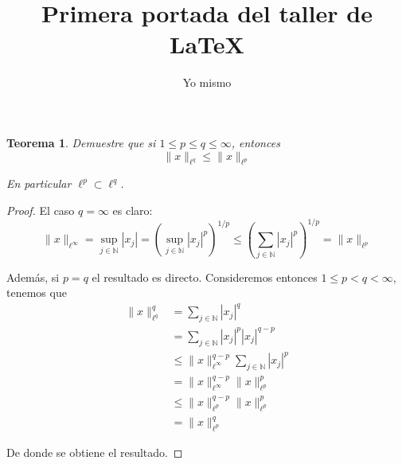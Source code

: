 \documentclass{article}
\title{Primera portada del taller de \LaTeX}
\author{Yo mismo}
\newtheorem{teo}{Teorema}
\begin{document}

\begin{titlepage}
\thispagestyle{empty}
\maketitle
\end{titlepage}

\begin{teo} Demuestre que si $1 \leq p \leq q \leq \infty$, entonces
	$$\|x\|_{\ell^{q}} \leq \|x\|_{\ell^{p}}$$
	
En particular $\ell^{p} \subset \ell^{q}$.
\end{teo}

\begin{proof} El caso $q = \infty$ es claro:
	$$\|x\|_{\ell^{\infty}} 
		= 	\sup_{j \in \mathbb{N}} |x_{j}|
		= 	\left(\sup_{j \in \mathbb{N}} |x_{j}|^{p}\right)^{1/p} 
		\leq	\left(\sum_{j \in \mathbb{N}} |x_{j}|^{p}\right)^{1/p} = \|x\|_{\ell^{p}}
	$$

Además, si $p = q$ el resultado es directo. Consideremos entonces $1 \leq p < q < \infty$, tenemos que
	\begin{align*}
		\|x\|_{\ell^{q}}^{q}
			&=		\sum_{j \in \mathbb{N}} |x_{j}|^{q}	\\
			&=		\sum_{j \in \mathbb{N}} |x_{j}|^{p} |x_{j}|^{q-p}	\\
			&\leq		\|x\|^{q-p}_{\ell^{\infty}} \sum_{j \in \mathbb{N}} |x_{j}|^{p}	\\
			&=		\|x\|^{q-p}_{\ell^{\infty}} \|x\|_{\ell^{p}}^{p}	\\
			&\leq		\|x\|^{q-p}_{\ell^{p}} \|x\|_{\ell^{p}}^{p}	\\
			&=		\|x\|_{\ell^{p}}^{q}		 
	\end{align*}

De donde se obtiene el resultado.
\end{proof}                                          
\end{document}
